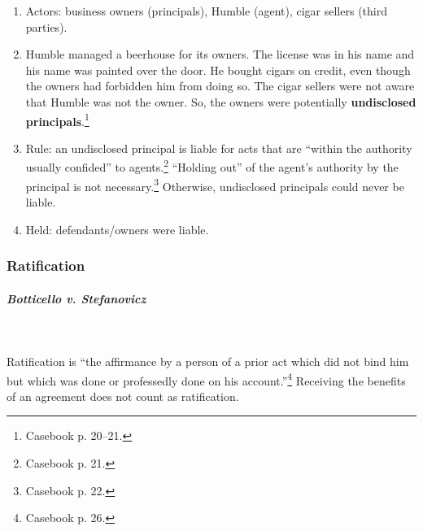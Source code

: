 \begin{enumerate}
    \item Actors: business owners (principals), Humble (agent), cigar sellers 
    (third parties).
    \item Humble managed a beerhouse for its owners. The license was in his 
    name and his name was painted over the door. He bought cigars on credit, 
    even though the owners had forbidden him from doing so. The cigar sellers 
    were not aware that Humble was not the owner. So, the owners were 
    potentially \textbf{undisclosed principals}.\footnote{Casebook p. 20--21.}
    \item Rule: an undisclosed principal is liable for acts that are ``within 
    the authority usually confided'' to agents.\footnote{Casebook p. 21.} 
    ``Holding out'' of the agent's authority by the principal is not 
    necessary.\footnote{Casebook p. 22.} Otherwise, undisclosed principals 
    could never be liable.
    \item Held: defendants/owners were liable.
\end{enumerate}

\subsubsection{Ratification}

\paragraph{\emph{Botticello v. Stefanovicz}}
~\\\\
Ratification is ``the affirmance by a person of a prior act which did not bind 
him but which was done or professedly done on his account.''\footnote{Casebook 
p. 26.} Receiving the benefits of an agreement does not count as ratification.

